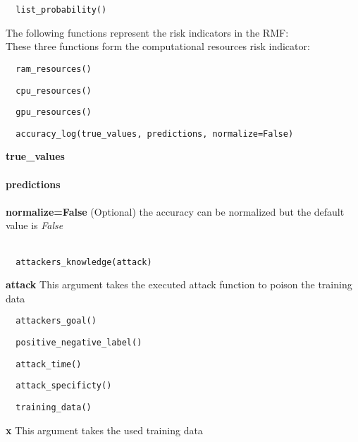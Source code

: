 \begin{lstlisting}
  list_probability()
\end{lstlisting}

The following functions represent the risk indicators in the RMF: \\
These three functions form the computational resources risk indicator: \\
\begin{lstlisting}
  ram_resources()
\end{lstlisting}

\begin{lstlisting}
  cpu_resources()
\end{lstlisting}

\begin{lstlisting}
  gpu_resources()
\end{lstlisting}

\begin{lstlisting}
  accuracy_log(true_values, predictions, normalize=False)
\end{lstlisting}

\noindent\textbf{true\_values}
\\ \\
\textbf{predictions}
\\ \\
\textbf{normalize=False}
(Optional) the accuracy can be normalized but the default value is \textit{False} \\ \\

\begin{lstlisting}
  attackers_knowledge(attack)
\end{lstlisting}

\noindent\textbf{attack}
This argument takes the executed attack function to poison the training data

\begin{lstlisting}
  attackers_goal()
\end{lstlisting}

\begin{lstlisting}
  positive_negative_label()
\end{lstlisting}

\begin{lstlisting}
  attack_time()
\end{lstlisting}

\begin{lstlisting}
  attack_specificty()
\end{lstlisting}

\begin{lstlisting}
  training_data()
\end{lstlisting}

\noindent\textbf{x}
This argument takes the used training data
